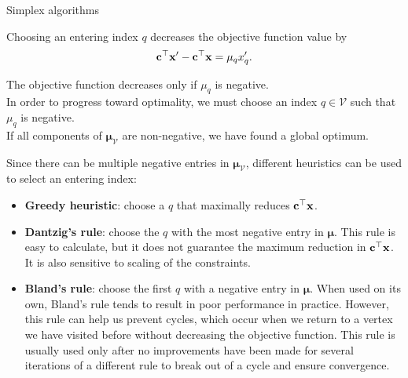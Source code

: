 \documentclass[11pt,compress,t,notes=noshow, xcolor=table]{beamer}
\begin{document}
\begin{vbframe}{Simplex algorithms}
\framebreak

Choosing an entering index $q$ decreases the objective function value by
$$
\mathbf{c}^\top \mathbf{x}' - \mathbf{c}^\top \mathbf{x} = \mu_q x'_q.
$$

\lz
\lz
The objective function decreases only if $\mu_q$ is negative.\\
\lz
In order to progress toward optimality, we must choose an index $q \in \mathcal{V}$ such that $\mu_q$ is negative.\\
\lz
If all components of $\boldsymbol{\mu}_{\mathcal{V}}$ are non-negative, we have found a global optimum.

\framebreak

Since there can be multiple negative entries in $\boldsymbol{\mu}_{\mathcal{V}}$, different heuristics can be used to select an entering index:

\begin{itemize}
    \item \textbf{Greedy heuristic}: choose a $q$ that maximally reduces $\mathbf{c}^\top \mathbf{x}$.
    \item \textbf{Dantzig's rule}: choose the $q$ with the most negative entry in $\boldsymbol{\mu}$. 
    This rule is easy to calculate, but it does not guarantee the maximum reduction in $\mathbf{c}^\top \mathbf{x}$. 
    It is also sensitive to scaling of the constraints.
    \item \textbf{Bland's rule}: choose the first $q$ with a negative entry in $\boldsymbol{\mu}$. 
    When used on its own, Bland's rule tends to result in poor performance in practice. 
    However, this rule can help us prevent cycles, which occur when we return to a vertex we have visited before without decreasing the objective function. 
    This rule is usually used only after no improvements have been made for several iterations of a different rule to break out of a cycle and ensure convergence.
\end{itemize}

\end{vbframe}
\end{document}

